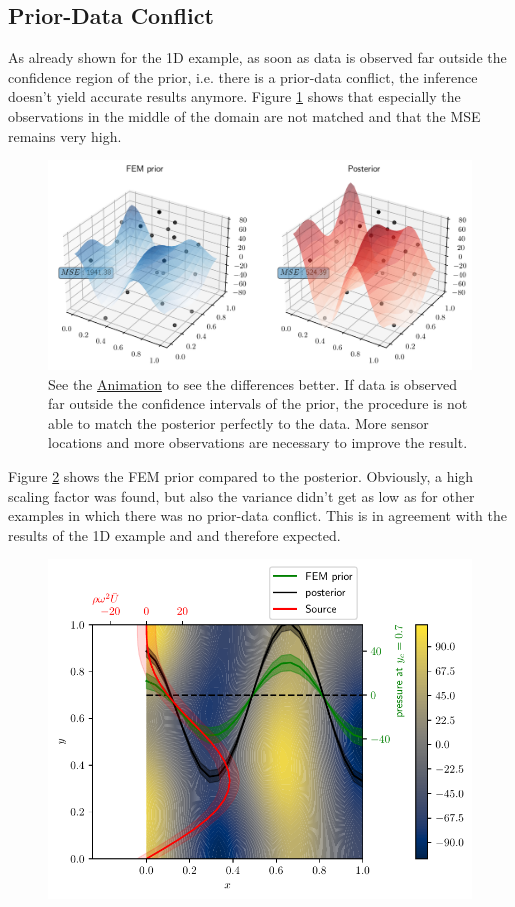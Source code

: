\documentclass[%
  a4paper,oneside,%
  11pt,%
  smallchapters,
  style=printdev,
  extramargin,
  green,%
  rgb, <cmyk>
  ]{tubsbook}
\begin{document}
\subsection{Prior-Data Conflict}
As already shown for the 1D example, as soon as data is observed far outside the confidence region of the prior, i.e. there is a prior-data conflict, the inference doesn't yield accurate results anymore. Figure \ref{fig:3dPriorDataConf} shows that especially the observations in the middle of the domain are not matched and that the MSE remains very high.
%
\begin{figure}[!ht]
\includegraphics[width=1\textwidth]{../../Python/Results/2D/prior_data_conflict/3dMSE.pdf}
\centering
\caption[Comparison of prior and posterior in a 3D view for the observations with a prior-data conflict]{See the \href{https://github.com/herluc/Masterarbeit/blob/master/MA_LucasHermann/Python/Results/2D/prior_data_conflict/3DMSE_conflict.gif}{Animation} to see the differences better. If data is observed far outside the confidence intervals of the prior, the procedure is not able to match the posterior perfectly to the data. More sensor locations and more observations are necessary to improve the result.}
\label{fig:3dPriorDataConf}
\end{figure}
%
Figure \ref{fig:PriorDataConfPOST} shows the FEM prior compared to the posterior. Obviously, a high scaling factor was found, but also the variance didn't get as low as for other examples in which there was no prior-data conflict. This is in agreement with the results of the 1D example and \cite{Evans2006} and therefore expected.
%
\begin{figure}[!ht]
\includegraphics[width=.8\textwidth]{../../Python/Results/2D/prior_data_conflict/SolutionCustomPosterior.pdf}
\centering
\caption{}
\label{fig:PriorDataConfPOST}
\end{figure}
\end{document}
